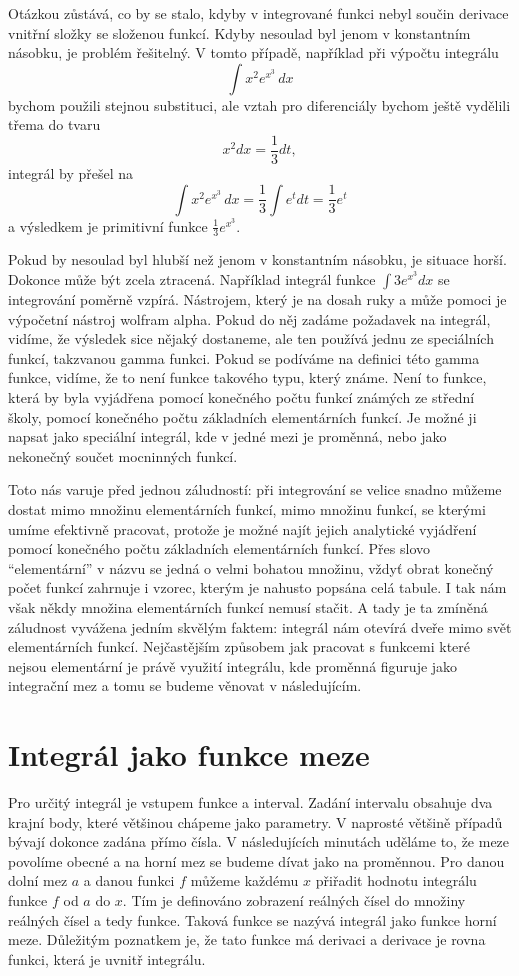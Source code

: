 \documentclass[12pt]{article}
\begin{document}
Otázkou zůstává, co by se stalo, kdyby v integrované funkci nebyl součin derivace vnitřní složky se složenou funkcí. Kdyby nesoulad byl jenom v konstantním násobku, je problém řešitelný. V tomto případě, například při výpočtu integrálu 
$$\int x^2 e^{x^3}\,dx$$ bychom použili stejnou substituci, ale vztah pro diferenciály bychom ještě vydělili třema do tvaru $$x^2 dx=\frac 13 dt,$$
integrál by přešel na
$$\int x^2 e^{x^3}\,dx=\frac 13\int e^t dt=\frac 13 e^t$$
a výsledkem je primitivní funkce $\frac 13 e^{x^3}.$

Pokud by nesoulad byl hlubší než jenom v konstantním násobku, je situace horší. Dokonce může být zcela ztracená. Například integrál funkce $\int 3e^{x^3}dx$ se integrování poměrně vzpírá. Nástrojem, který je na dosah ruky a může pomoci je výpočetní nástroj wolfram alpha. Pokud do něj zadáme požadavek na integrál, vidíme, že výsledek sice nějaký dostaneme, ale ten používá jednu ze speciálních funkcí, takzvanou gamma funkci. Pokud se podíváme na definici této gamma funkce, vidíme, že to není funkce takového typu, který známe. Není to funkce, která by byla vyjádřena pomocí konečného počtu funkcí známých ze střední školy, pomocí konečného počtu základních elementárních funkcí. Je možné ji napsat jako speciální integrál, kde v jedné mezi je proměnná, nebo jako nekonečný součet mocninných funkcí.

Toto nás varuje před jednou záludností: při integrování se velice snadno můžeme dostat mimo množinu elementárních funkcí, mimo množinu funkcí, se kterými umíme efektivně pracovat, protože je možné najít jejich analytické vyjádření pomocí konečného počtu základních elementárních funkcí. Přes slovo ``elementární'' v názvu se jedná o velmi bohatou množinu, vždyť obrat konečný počet funkcí zahrnuje i vzorec, kterým je nahusto popsána celá tabule. I tak nám však někdy množina elementárních funkcí nemusí stačit. A tady je ta zmíněná záludnost vyvážena jedním skvělým faktem: integrál nám otevírá dveře mimo svět elementárních funkcí. Nejčastějším způsobem jak pracovat s funkcemi které nejsou elementární je právě využití integrálu, kde proměnná figuruje jako integrační mez a tomu se budeme věnovat v následujícím.

\section*{Integrál jako funkce meze}

Pro určitý integrál je vstupem funkce a interval. Zadání intervalu obsahuje dva krajní body, které většinou chápeme jako parametry. V naprosté většině případů bývají dokonce zadána přímo čísla. V následujících minutách uděláme to, že meze povolíme obecné a na horní mez se budeme dívat jako na proměnnou. Pro danou dolní mez $a$ a danou funkci $f$ můžeme každému $x$ přiřadit hodnotu integrálu funkce $f$ od $a$ do $x$. Tím je definováno zobrazení reálných čísel do množiny reálných čísel a tedy funkce. Taková funkce se nazývá integrál jako funkce horní meze. Důležitým poznatkem je, že tato funkce má derivaci a derivace je rovna funkci, která je uvnitř integrálu.
\end{document}
